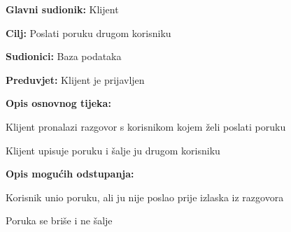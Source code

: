 						\noindent {}
						\begin{packed_item}
							
							\item \textbf{Glavni sudionik: }Klijent
							\item  \textbf{Cilj: }Poslati poruku drugom korisniku
							\item  \textbf{Sudionici: }Baza podataka
							\item  \textbf{Preduvjet: }Klijent je prijavljen
							\item  \textbf{Opis osnovnog tijeka:}
							
							\item[] \begin{packed_enum}
								
								\item Klijent pronalazi razgovor s korisnikom kojem želi poslati poruku
								\item Klijent upisuje poruku i šalje ju drugom korisniku
								  
							\end{packed_enum}
							
							\item  \textbf{Opis mogućih odstupanja:}
							
							\item[] \begin{packed_item}
								
								\item[3.a] Korisnik unio poruku, ali ju nije poslao prije izlaska iz razgovora
								\item[] \begin{packed_enum}
									
									\item Poruka se briše i ne šalje 
									
									
								\end{packed_enum}
								
							\end{packed_item}
						\end{packed_item}
						\noindent {}
